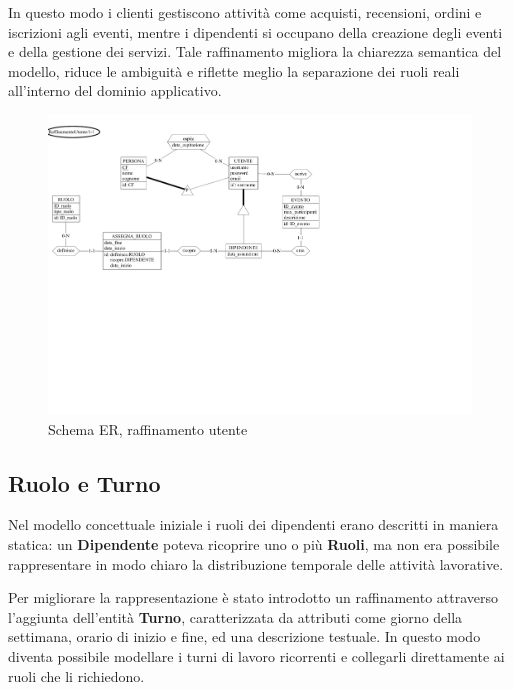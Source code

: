 \documentclass[a4paper,12pt]{report}
\begin{document}
\vspace{\baselineskip}
In questo modo i clienti gestiscono attività come acquisti, recensioni, ordini e iscrizioni agli eventi, mentre
i dipendenti si occupano della creazione degli eventi e della gestione dei servizi. Tale raffinamento migliora
la chiarezza semantica del modello, riduce le ambiguità e riflette meglio la separazione dei ruoli reali all'interno
del dominio applicativo.

\begin{figure}[H]
	\centering
	\includegraphics[width=\textwidth, trim=0 250pt 300pt 0, clip]{./pdf/raffinamento utente.pdf}
	\caption{Schema ER, raffinamento utente}
	\label{fig:raffinamento-utente}
\end{figure}

\newpage

\subsection{Ruolo e Turno}
Nel modello concettuale iniziale i ruoli dei dipendenti erano descritti in maniera statica:
un \textbf{Dipendente} poteva ricoprire uno o più \textbf{Ruoli}, ma non era possibile rappresentare
in modo chiaro la distribuzione temporale delle attività lavorative.

\vspace{\baselineskip}
Per migliorare la rappresentazione è stato introdotto un raffinamento attraverso
l'aggiunta dell'entità \textbf{Turno}, caratterizzata da attributi come giorno della settimana,
orario di inizio e fine, ed una descrizione testuale. In questo modo diventa possibile
modellare i turni di lavoro ricorrenti e collegarli direttamente ai ruoli che li richiedono.
\end{document}
